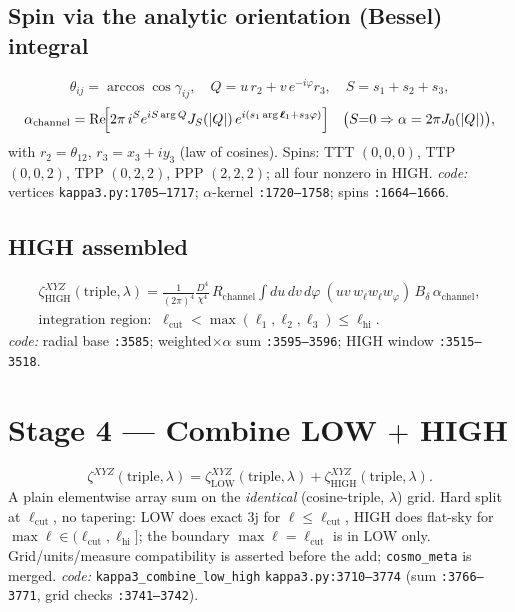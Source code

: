 \documentclass[11pt]{article}
\newcommand{\code}[1]{\texttt{\footnotesize #1}}
\newcommand{\chh}{\chi}
\newcommand{\lam}{\lambda}
\newcommand{\Dgrow}{D}
\DeclareMathOperator{\Real}{Re}
\begin{document}
\subsection{Spin via the analytic orientation (Bessel) integral}
\begin{equation}
\theta_{ij}=\arccos\cos\gamma_{ij},\quad
Q=u\,r_2+v\,e^{-i\varphi}r_3,\quad S=s_1+s_2+s_3,
\end{equation}
\begin{equation}
\alpha_{\mathrm{channel}}=\Real\!\Bigl[2\pi\,i^{S}e^{iS\arg Q}J_S(|Q|)\,
   e^{i(s_1\arg\boldsymbol\ell_1+s_3\varphi)}\Bigr]\quad
   \bigl(S{=}0\Rightarrow\alpha=2\pi J_0(|Q|)\bigr),
\end{equation}
with $r_2=\theta_{12}$, $r_3=x_3+iy_3$ (law of cosines). Spins:
TTT $(0,0,0)$, TTP $(0,0,2)$, TPP $(0,2,2)$, PPP $(2,2,2)$; all four nonzero in HIGH.
\textit{code:} vertices \code{kappa3.py:1705--1717}; $\alpha$-kernel \code{:1720--1758};
spins \code{:1664--1666}.

\subsection{HIGH assembled}
\begin{equation}
\begin{aligned}
\zeta_{\mathrm{HIGH}}^{XYZ}(\text{triple},\lam)=
\frac{1}{(2\pi)^4}\frac{\Dgrow^4}{\chh^4}\,R_{\mathrm{channel}}
\int du\,dv\,d\varphi\ (uv\,w_\ell w_\ell w_\varphi)\,B_\delta\,\alpha_{\mathrm{channel}},\\[2pt]
\text{integration region: }\ \ell_{\mathrm{cut}}<\max(\ell_1,\ell_2,\ell_3)\le\ell_{\mathrm{hi}}.
\end{aligned}
\end{equation}
\textit{code:} radial base \code{:3585}; weighted$\times\alpha$ sum \code{:3595--3596};
HIGH window \code{:3515--3518}.

\section{Stage 4 --- Combine LOW $+$ HIGH}
\begin{equation}
\zeta^{XYZ}(\text{triple},\lam)=\zeta_{\mathrm{LOW}}^{XYZ}(\text{triple},\lam)
 +\zeta_{\mathrm{HIGH}}^{XYZ}(\text{triple},\lam).
\end{equation}
A plain elementwise array sum on the \emph{identical} (cosine-triple, $\lam$) grid.
Hard split at $\ell_{\mathrm{cut}}$, no tapering: LOW does exact 3j for $\ell\le\ell_{\mathrm{cut}}$,
HIGH does flat-sky for $\max\ell\in(\ell_{\mathrm{cut}},\ell_{\mathrm{hi}}]$; the boundary
$\max\ell=\ell_{\mathrm{cut}}$ is in LOW only. Grid/units/measure compatibility is asserted
before the add; \texttt{cosmo\_meta} is merged.\quad
\textit{code:} \code{kappa3\_combine\_low\_high} \code{kappa3.py:3710--3774} (sum \code{:3766--3771},
grid checks \code{:3741--3742}).
\end{document}
